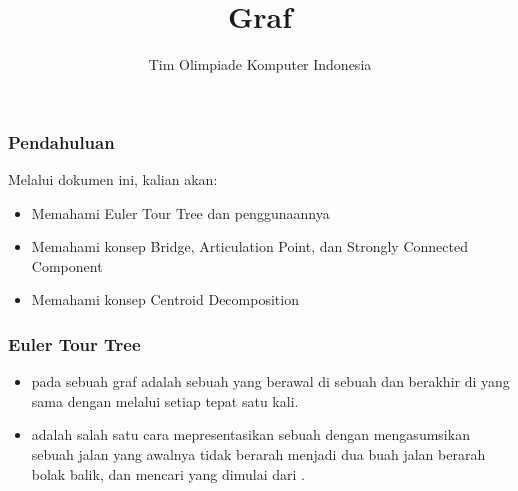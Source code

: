 

\title{Graf}
\author{Tim Olimpiade Komputer Indonesia}
\date{}

\usepackage{tikz} 



\begin{frame}
\titlepage
\end{frame}

\begin{frame}
\frametitle{Pendahuluan}
Melalui dokumen ini, kalian akan:
\begin{itemize}
  \item Memahami Euler Tour Tree dan penggunaannya
  \item Memahami konsep Bridge, Articulation Point, dan Strongly Connected Component
  \item Memahami konsep Centroid Decomposition
\end{itemize}
\end{frame}

\begin{frame}
\frametitle{Euler Tour Tree}
\begin{itemize}
  \item {} pada sebuah graf adalah sebuah \ftrail yang berawal di sebuah \fnode dan berakhir di \fnode yang sama dengan melalui setiap \fedge tepat satu kali.
  \item {} adalah salah satu cara mepresentasikan sebuah \ftree dengan mengasumsikan sebuah jalan yang awalnya tidak berarah menjadi dua buah jalan berarah bolak balik, dan mencari \feulerTour yang dimulai dari \froot.
\end{itemize}
\begin{figure}[!h]
\centering
\end{figure}
\end{frame}

